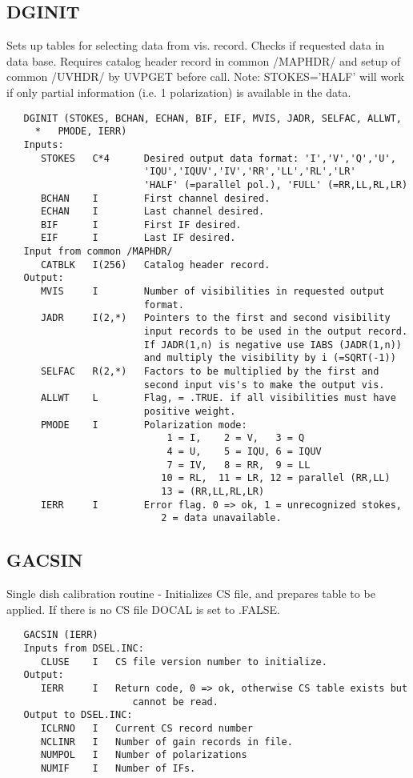 \subsection{DGINIT}
Sets up tables for selecting data from vis. record. Checks if
requested data in data base.  Requires catalog header record
in common /MAPHDR/ and setup of common /UVHDR/ by UVPGET before
call.
Note: STOKES='HALF' will work if only partial information (i.e.
1 polarization) is available in the data.
\begin{verbatim}
   DGINIT (STOKES, BCHAN, ECHAN, BIF, EIF, MVIS, JADR, SELFAC, ALLWT,
     *   PMODE, IERR)
   Inputs:
      STOKES   C*4      Desired output data format: 'I','V','Q','U',
                        'IQU','IQUV','IV','RR','LL','RL','LR'
                        'HALF' (=parallel pol.), 'FULL' (=RR,LL,RL,LR)
      BCHAN    I        First channel desired.
      ECHAN    I        Last channel desired.
      BIF      I        First IF desired.
      EIF      I        Last IF desired.
   Input from common /MAPHDR/
      CATBLK   I(256)   Catalog header record.
   Output:
      MVIS     I        Number of visibilities in requested output
                        format.
      JADR     I(2,*)   Pointers to the first and second visibility
                        input records to be used in the output record.
                        If JADR(1,n) is negative use IABS (JADR(1,n))
                        and multiply the visibility by i (=SQRT(-1))
      SELFAC   R(2,*)   Factors to be multiplied by the first and
                        second input vis's to make the output vis.
      ALLWT    L        Flag, = .TRUE. if all visibilities must have
                        positive weight.
      PMODE    I        Polarization mode:
                            1 = I,    2 = V,   3 = Q
                            4 = U,    5 = IQU, 6 = IQUV
                            7 = IV,   8 = RR,  9 = LL
                           10 = RL,  11 = LR, 12 = parallel (RR,LL)
                           13 = (RR,LL,RL,LR)
      IERR     I        Error flag. 0 => ok, 1 = unrecognized stokes,
                           2 = data unavailable.
\end{verbatim}

\subsection{GACSIN}
Single dish calibration routine - Initializes CS file, and prepares
table to be applied.  If there is no CS file DOCAL is set to .FALSE.
\begin{verbatim}
   GACSIN (IERR)
   Inputs from DSEL.INC:
      CLUSE    I   CS file version number to initialize.
   Output:
      IERR     I   Return code, 0 => ok, otherwise CS table exists but
                      cannot be read.
   Output to DSEL.INC:
      ICLRNO   I   Current CS record number
      NCLINR   I   Number of gain records in file.
      NUMPOL   I   Number of polarizations
      NUMIF    I   Number of IFs.
\end{verbatim}

